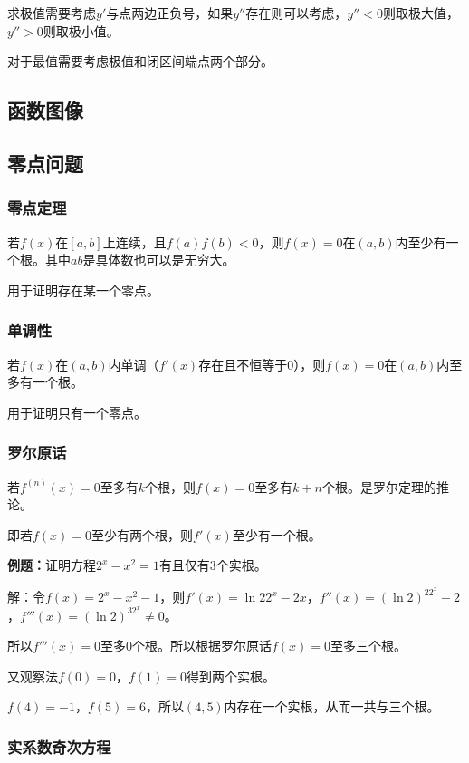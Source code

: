 \documentclass[UTF8, 12pt]{ctexart}
\begin{document}
求极值需要考虑$y'$与点两边正负号，如果$y''$存在则可以考虑，$y''<0$则取极大值，$y''>0$则取极小值。

对于最值需要考虑极值和闭区间端点两个部分。

\subsection{函数图像}

\subsection{零点问题}

\subsubsection{零点定理}

若$f(x)$在$[a,b]$上连续，且$f(a)f(b)<0$，则$f(x)=0$在$(a,b)$内至少有一个根。其中$ab$是具体数也可以是无穷大。

用于证明存在某一个零点。

\subsubsection{单调性}

若$f(x)$在$(a,b)$内单调（$f'(x)$存在且不恒等于0），则$f(x)=0$在$(a,b)$内至多有一个根。

用于证明只有一个零点。

\subsubsection{罗尔原话}

若$f^{(n)}(x)=0$至多有$k$个根，则$f(x)=0$至多有$k+n$个根。是罗尔定理的推论。

即若$f(x)=0$至少有两个根，则$f'(x)$至少有一个根。

\textbf{例题：}证明方程$2^x-x^2=1$有且仅有3个实根。

解：令$f(x)=2^x-x^2-1$，则$f'(x)=\ln22^x-2x$，$f''(x)=(\ln2)^22^x-2$，$f'''(x)=(\ln2)^32^x\neq 0$。

所以$f'''(x)=0$至多0个根。所以根据罗尔原话$f(x)=0$至多三个根。

又观察法$f(0)=0$，$f(1)=0$得到两个实根。

$f(4)=-1$，$f(5)=6$，所以$(4,5)$内存在一个实根，从而一共与三个根。

\subsubsection{实系数奇次方程}
\end{document}
